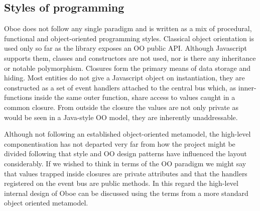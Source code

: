 \documentclass[12pt, ]{article}
\begin{document}
\subsection{Styles of programming}\label{styles-of-programming}

Oboe does not follow any single paradigm and is written as a mix of
procedural, functional and object-oriented programming styles. Classical
object orientation is used only so far as the library exposes an OO
public API. Although Javascript supports them, classes and constructors
are not used, nor is there any inheritance or notable polymorphism.
Closures form the primary means of data storage and hiding. Most
entities do not give a Javascript object on instantiation, they are
constructed as a set of event handlers attached to the central bus
which, as inner-functions inside the same outer function, share access
to values caught in a common closure. From outside the closure the
values are not only private as would be seen in a Java-style OO model,
they are inherently unaddressable.

Although not following an established object-oriented metamodel, the
high-level componentisation has not departed very far from how the
project might be divided following that style and OO design patterns
have influenced the layout considerably. If we wished to think in terms
of the OO paradigm we might say that values trapped inside closures are
private attributes and that the handlers registered on the event bus are
public methods. In this regard the high-level internal design of Oboe
can be discussed using the terms from a more standard object oriented
metamodel.
\end{document}
